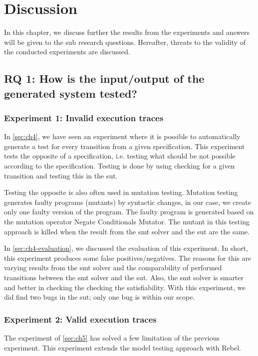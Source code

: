 \chapter{Discussion}

In this chapter, we discuss further the results from the experiments and answers will be given to the sub research questions. Hereafter, threats to the validity of the conducted experiments are discussed.

\section{RQ 1: How is the input/output of the generated system tested?}

\subsection{Experiment 1: Invalid execution traces}
In \autoref{sec:ch4}, we have seen an experiment where it is possible to automatically generate a test for every transition from a given specification. This experiment tests the opposite of a specification, i.e. testing what should be not possible according to the specification. Testing is done by using checking for a given transition and testing this in the \gls{sut}.

Testing the opposite is also often used in mutation testing. Mutation testing generates faulty programs (mutants) by syntactic changes, in our case, we create only one faulty version of the program. The faulty program is generated based on the mutation operator Negate Conditionals Mutator. The mutant in this testing approach is killed when the result from the \gls{smt} solver and the \gls{sut} are the same.

In \autoref{sec:ch4-evaluation}, we discussed the evaluation of this experiment. In short, this experiment produces some false positives/negatives. The reasons for this are varying results from the \gls{smt} solver and the comparability of performed transitions between the \gls{smt} solver and the \gls{sut}. Also, the \gls{smt} solver is smarter and better in checking the checking the satisfiability. With this experiment, we did find two bugs in the \gls{sut}; only one bug is within our scope.


\subsection{Experiment 2: Valid execution traces}
The experiment of \autoref{sec:ch5} has solved a few limitation of the previous experiment. This experiment extends the model testing approach with Rebel.

